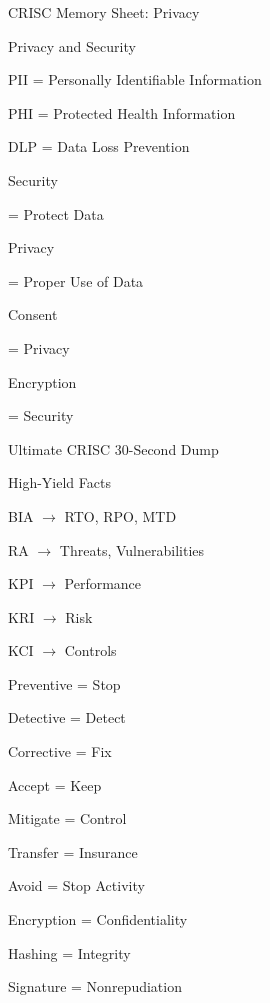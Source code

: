 \documentclass{beamer}
\begin{document}
	\begin{frame}[shrink=10]{CRISC Memory Sheet: Privacy}
		\begin{block}{Privacy and Security}
			
			PII = Personally Identifiable Information
			
			PHI = Protected Health Information
			
			DLP = Data Loss Prevention
			
			\vspace{0.15cm}
			
			Security
			
			= Protect Data
			
			\vspace{0.1cm}
			
			Privacy
			
			= Proper Use of Data
			
			\vspace{0.1cm}
			
			Consent
			
			= Privacy
			
			\vspace{0.1cm}
			
			Encryption
			
			= Security
			
		\end{block}
	\end{frame}
	
	\begin{frame}[shrink=10]{Ultimate CRISC 30-Second Dump}
		\begin{block}{High-Yield Facts}
			
			BIA $\rightarrow$ RTO, RPO, MTD
			
			RA $\rightarrow$ Threats, Vulnerabilities
			
			KPI $\rightarrow$ Performance
			
			KRI $\rightarrow$ Risk
			
			KCI $\rightarrow$ Controls
			
			\vspace{0.15cm}
			
			Preventive = Stop
			
			Detective = Detect
			
			Corrective = Fix
			
			\vspace{0.15cm}
			
			Accept = Keep
			
			Mitigate = Control
			
			Transfer = Insurance
			
			Avoid = Stop Activity
			
			\vspace{0.15cm}
			
			Encryption = Confidentiality
			
			Hashing = Integrity
			
			Signature = Nonrepudiation
			
		\end{block}
	\end{frame}
	
\end{document}
